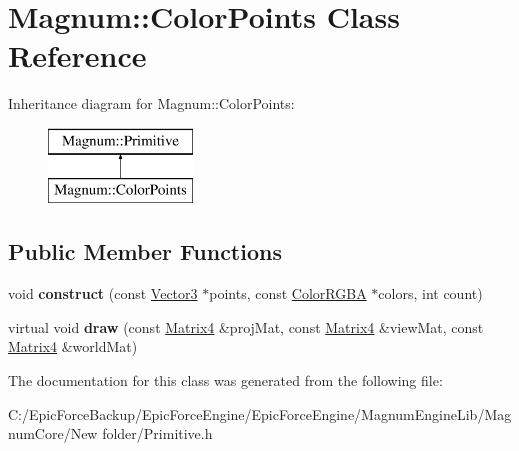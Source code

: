 \hypertarget{class_magnum_1_1_color_points}{}\section{Magnum\+:\+:Color\+Points Class Reference}
\label{class_magnum_1_1_color_points}
Inheritance diagram for Magnum\+:\+:Color\+Points\+:\begin{figure}[H]
\begin{center}
\leavevmode
\includegraphics[height=2.000000cm]{class_magnum_1_1_color_points}
\end{center}
\end{figure}
\subsection*{Public Member Functions}
\begin{DoxyCompactItemize}
\item 
void {\bfseries construct} (const \hyperlink{class_magnum_1_1_vector3}{Vector3} $\ast$points, const \hyperlink{class_magnum_1_1_color_r_g_b_a}{Color\+R\+G\+BA} $\ast$colors, int count)\hypertarget{class_magnum_1_1_color_points_a92541d16a076cd0694aaf3a233915fb7}{}\label{class_magnum_1_1_color_points_a92541d16a076cd0694aaf3a233915fb7}

\item 
virtual void {\bfseries draw} (const \hyperlink{class_magnum_1_1_matrix4}{Matrix4} \&proj\+Mat, const \hyperlink{class_magnum_1_1_matrix4}{Matrix4} \&view\+Mat, const \hyperlink{class_magnum_1_1_matrix4}{Matrix4} \&world\+Mat)\hypertarget{class_magnum_1_1_color_points_afe8d6b01b7acc3662db17e69ce063a75}{}\label{class_magnum_1_1_color_points_afe8d6b01b7acc3662db17e69ce063a75}

\end{DoxyCompactItemize}


The documentation for this class was generated from the following file\+:\begin{DoxyCompactItemize}
\item 
C\+:/\+Epic\+Force\+Backup/\+Epic\+Force\+Engine/\+Epic\+Force\+Engine/\+Magnum\+Engine\+Lib/\+Magnum\+Core/\+New folder/Primitive.\+h\end{DoxyCompactItemize}
